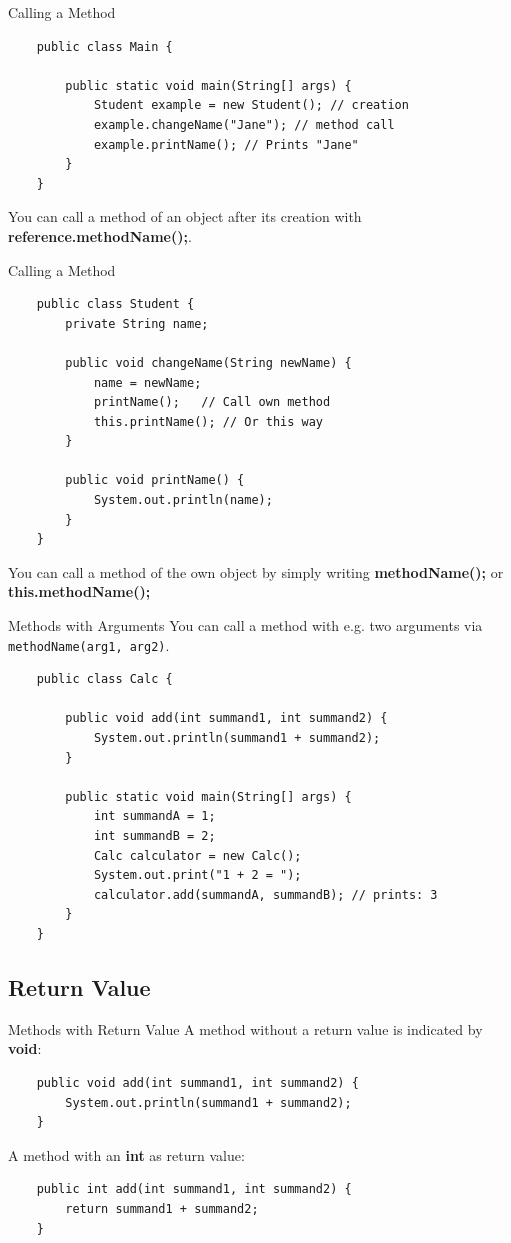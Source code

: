 \begin{frame}[fragile]{Calling a Method}
\begin{lstlisting}
	public class Main {
	    
	    public static void main(String[] args) {
	        Student example = new Student(); // creation
	        example.changeName("Jane"); // method call
	        example.printName(); // Prints "Jane"
	    }
	}
	\end{lstlisting}
	You can call a method of an object after its creation with \textbf{reference.methodName();}.
\end{frame}

\begin{frame}[fragile]{Calling a Method}
\begin{lstlisting}
	public class Student {
		private String name;
	
	    public void changeName(String newName) {
			name = newName;
			printName();   // Call own method
			this.printName(); // Or this way
	    }
	    
	    public void printName() {
	        System.out.println(name);
	    }
	}
	\end{lstlisting}
	You can call a method of the own object by simply writing \textbf{methodName();} or \textbf{this.methodName();}
\end{frame}

\begin{frame}[fragile]{Methods with Arguments}
	You can call a method with e.g. two arguments via \texttt{methodName(arg1, arg2)}.
	\begin{lstlisting}
	public class Calc {
	
	    public void add(int summand1, int summand2) {
	        System.out.println(summand1 + summand2);
	    }
	    
	    public static void main(String[] args) {
	        int summandA = 1;
	        int summandB = 2;
	        Calc calculator = new Calc();
	        System.out.print("1 + 2 = ");
	        calculator.add(summandA, summandB); // prints: 3
	    }
	}
	\end{lstlisting}
\end{frame}

\subsection{Return Value}
\begin{frame}[fragile]{Methods with Return Value}
	A method without a return value is indicated by \textbf{void}:
	\begin{lstlisting}
	public void add(int summand1, int summand2) {
	    System.out.println(summand1 + summand2);
	}
	\end{lstlisting}
	A method with an \textbf{int} as return value:
	\begin{lstlisting}
	public int add(int summand1, int summand2) {
	    return summand1 + summand2;
	}
	\end{lstlisting}
\end{frame}


